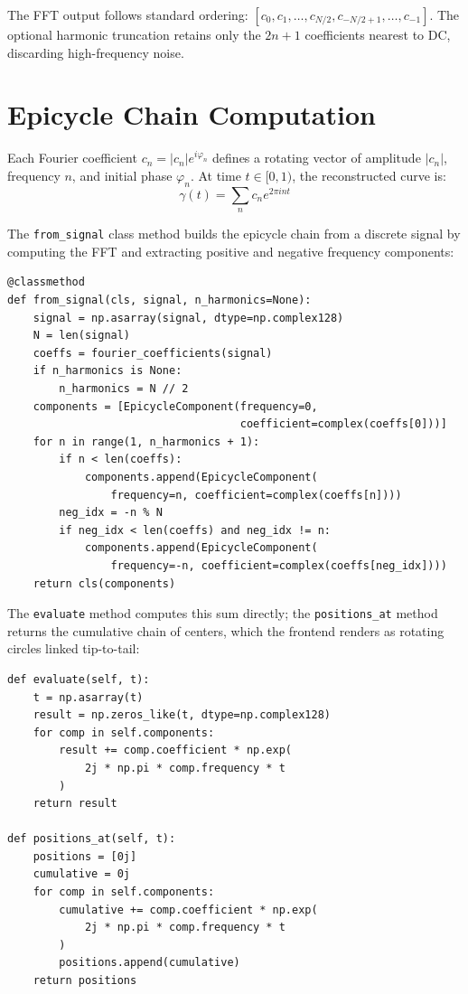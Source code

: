 \documentclass[12pt,a4paper]{report}
\theoremstyle{thms}
\theoremstyle{defns}
\begin{document}
The FFT output follows standard ordering: $[c_0, c_1, \ldots, c_{N/2}, c_{-N/2+1}, \ldots, c_{-1}]$. The optional harmonic truncation retains only the $2n+1$ coefficients nearest to DC, discarding high-frequency noise.

\section{Epicycle Chain Computation}
\label{app:epicycle_chain}

Each Fourier coefficient $c_n = |c_n|e^{i\varphi_n}$ defines a rotating vector of amplitude $|c_n|$, frequency $n$, and initial phase $\varphi_n$. At time $t \in [0, 1)$, the reconstructed curve is:
\begin{equation}
    \gamma(t) = \sum_n c_n e^{2\pi int}
\end{equation}

The \texttt{from\_signal} class method builds the epicycle chain from a discrete signal by computing the FFT and extracting positive and negative frequency components:

\begin{lstlisting}[caption={Building an epicycle chain from a signal (\texttt{epicycles.py})}]
@classmethod
def from_signal(cls, signal, n_harmonics=None):
    signal = np.asarray(signal, dtype=np.complex128)
    N = len(signal)
    coeffs = fourier_coefficients(signal)
    if n_harmonics is None:
        n_harmonics = N // 2
    components = [EpicycleComponent(frequency=0,
                                    coefficient=complex(coeffs[0]))]
    for n in range(1, n_harmonics + 1):
        if n < len(coeffs):
            components.append(EpicycleComponent(
                frequency=n, coefficient=complex(coeffs[n])))
        neg_idx = -n % N
        if neg_idx < len(coeffs) and neg_idx != n:
            components.append(EpicycleComponent(
                frequency=-n, coefficient=complex(coeffs[neg_idx])))
    return cls(components)
\end{lstlisting}

The \texttt{evaluate} method computes this sum directly; the \texttt{positions\_at} method returns the cumulative chain of centers, which the frontend renders as rotating circles linked tip-to-tail:

\begin{lstlisting}[caption={Epicycle chain evaluation (\texttt{epicycles.py})}]
def evaluate(self, t):
    t = np.asarray(t)
    result = np.zeros_like(t, dtype=np.complex128)
    for comp in self.components:
        result += comp.coefficient * np.exp(
            2j * np.pi * comp.frequency * t
        )
    return result

def positions_at(self, t):
    positions = [0j]
    cumulative = 0j
    for comp in self.components:
        cumulative += comp.coefficient * np.exp(
            2j * np.pi * comp.frequency * t
        )
        positions.append(cumulative)
    return positions
\end{lstlisting}
\end{document}

